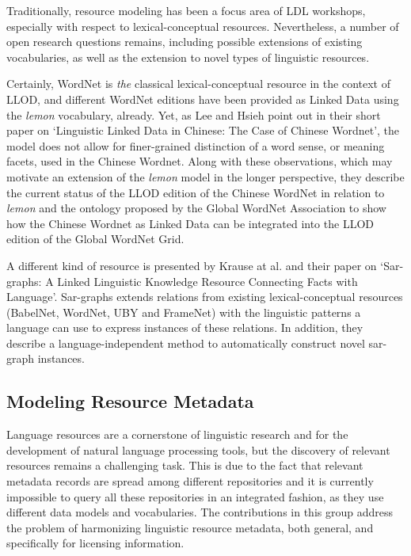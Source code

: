Traditionally, resource modeling has been a focus area of LDL workshops, especially with respect to lexical-conceptual resources. 
Nevertheless, a number of open research questions remains, including possible extensions of existing vocabularies, as well as the extension to novel types of linguistic resources.

Certainly, WordNet is \emph{the} classical lexical-conceptual resource in the context of LLOD, and different WordNet editions have been provided as Linked Data using the \emph{lemon} vocabulary, already.
Yet, as Lee and Hsieh point out in their short paper on `Linguistic Linked Data in Chinese: The Case of Chinese Wordnet', the model does not allow for finer-grained distinction of a word sense, or meaning facets, used in the Chinese Wordnet. Along with these observations, which may motivate an extension of the \emph{lemon} model in the longer perspective, they describe the current status of the LLOD edition of the Chinese WordNet in relation to \emph{lemon} and the ontology proposed by the Global WordNet Association to show how the Chinese Wordnet as Linked Data can be integrated into the LLOD edition of the Global WordNet Grid.

A different kind of resource is presented by Krause at al. and  their paper on `Sar-graphs: A Linked Linguistic Knowledge Resource Connecting Facts with Language'. Sar-graphs extends relations from existing lexical-conceptual resources (BabelNet, WordNet, UBY and FrameNet) with the linguistic patterns a language can use to express instances of these relations. In addition, they describe a language-independent method to automatically construct novel sar-graph instances. 

\subsection{Modeling Resource Metadata}

Language resources are a cornerstone of linguistic research and for the development of natural language processing tools, but the discovery of relevant resources remains a challenging task. 
This is due to the fact that relevant metadata records are spread among different repositories and it is currently impossible to query all these repositories in an integrated fashion, as they use different data models and vocabularies. The contributions in this group address the problem of harmonizing linguistic resource metadata, both general, and specifically for licensing information.

